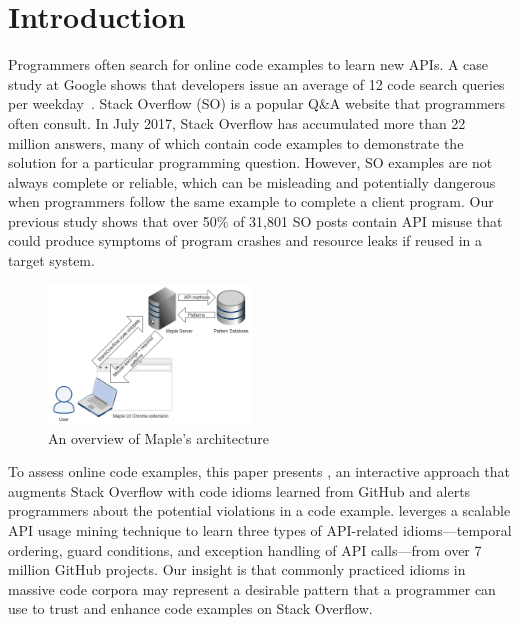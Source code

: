 \section{Introduction}
\label{sec:intro}
Programmers often search for online code examples to learn new APIs. A case study at Google shows that developers issue an average of 12 code search queries per weekday~\cite{sadowski2015developers}. Stack Overflow (SO) is a popular Q\&A website that programmers often consult. In July 2017, Stack Overflow has accumulated more than 22 million answers, many of which contain code examples to demonstrate the solution for a particular programming question. However, SO examples are not always complete or reliable, which can be misleading and potentially dangerous when programmers follow the same example to complete a client program. Our previous study shows that over 50\% of 31,801 SO posts contain API misuse that could produce symptoms of program crashes and resource leaks if reused in a target system. %

\begin{figure}
\includegraphics[width=0.48\textwidth]{mapleUIsystemflow.PNG}
\vspace{.1in}
\caption{An overview of Maple's architecture}
\label{fig:arch}
\end{figure}

To assess online code examples, this paper presents {\soa}, an interactive approach that augments Stack Overflow with code idioms learned from GitHub and alerts programmers about the potential violations in a code example. {\soa} leverges a scalable API usage mining technique to learn three types of API-related idioms---temporal ordering, guard conditions, and exception handling of API calls---from over 7 million GitHub projects. Our insight is that commonly practiced idioms in massive code corpora may represent a desirable pattern that a programmer can use to trust and enhance code examples on Stack Overflow. 

